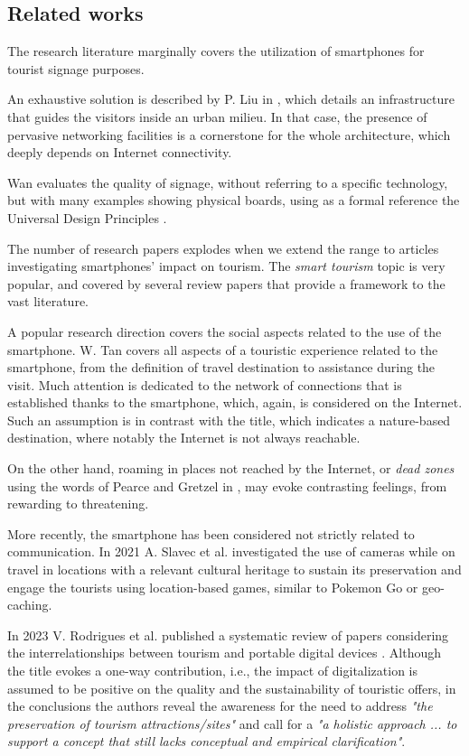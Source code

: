 \documentclass[sustainability,article,submit,pdftex,moreauthors]{Definitions/mdpi}
\begin{document}

\subsection{Related works}

The research literature marginally covers the utilization of smartphones for tourist signage purposes.

An exhaustive solution is described by P. Liu in \cite{liu16a}, which details an infrastructure that guides the visitors inside an urban milieu. In that case, the presence of pervasive networking facilities is a cornerstone for the whole architecture, which deeply depends on Internet connectivity. 

Wan \cite{wan22a} evaluates the quality of signage, without referring to a specific technology, but with many examples showing physical boards, using as a formal reference the Universal Design Principles \cite{udi97a}.

The number of research papers explodes when we extend the range to articles investigating smartphones' impact on tourism. The {\em smart tourism} topic is very popular, and covered by several review papers that provide a framework to the vast literature.

A popular research direction covers the social aspects related to the use of the smartphone. W. Tan \cite{tan17a} covers all aspects of a touristic experience related to the smartphone, from the definition of travel destination to assistance during the visit. Much attention is dedicated to the network of connections that is established thanks to the smartphone, which, again, is considered on the Internet. Such an assumption is in contrast with the title, which indicates a nature-based destination, where notably the Internet is not always reachable.

On the other hand, roaming in places not reached by the Internet, or {\em dead zones} using the words of Pearce and Gretzel in \cite{pea12a}, may evoke contrasting feelings, from rewarding to threatening.

More recently, the smartphone has been considered not strictly related to communication. In 2021 A. Slavec et al. investigated the use of cameras \cite{sla21a} while on travel in locations with a relevant cultural heritage to sustain its preservation and engage the tourists using location-based games, similar to Pokemon Go or geo-caching.

In 2023 V. Rodrigues et al. published a systematic review of papers considering the interrelationships between tourism and portable digital devices \cite{rod23a}. Although the title evokes a one-way contribution, i.e., the impact of digitalization is assumed to be positive on the quality and the sustainability of touristic offers, in the conclusions the authors reveal the awareness for the need to address {\em "the preservation of tourism attractions/sites"} and call for a {\em "a holistic approach ... to support a concept that still lacks conceptual and empirical clarification"}.
\end{document}

